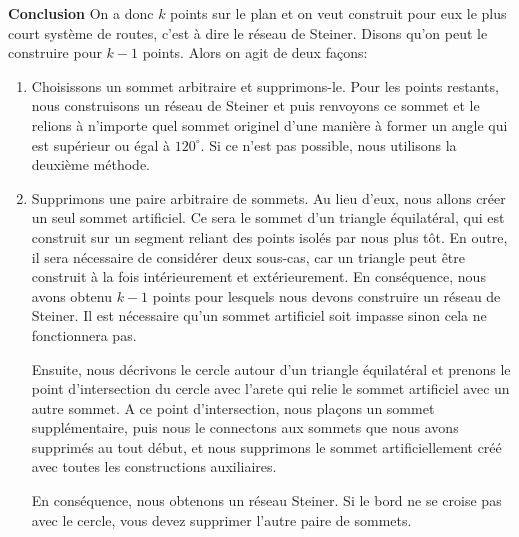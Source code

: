 \documentclass[10pt,a4paper]{article}%
\theoremstyle{theorem}
\theoremstyle{definition}
\begin{document}
        		\textbf{Conclusion}
        		On a donc $k$ points sur le plan et on veut construit pour eux le plus court système de routes, c'est à dire le réseau de Steiner. Disons qu'on peut le construire pour $k-1$ points. Alors on agit de deux façons:
        		\begin{enumerate}
        			\item Choisissons un sommet arbitraire et supprimons-le. Pour les points restants, nous construisons un réseau de Steiner et puis renvoyons ce sommet et le relions à n'importe quel sommet originel d'une manière à former un angle qui est supérieur ou égal à $120^\circ$. Si ce n'est pas possible, nous utilisons la deuxième méthode.
        			\item Supprimons une paire arbitraire de sommets. Au lieu d'eux, nous allons créer un seul sommet artificiel. Ce sera le sommet d'un triangle équilatéral, qui est construit sur un segment reliant des points isolés par nous plus tôt. En outre, il sera nécessaire de considérer deux sous-cas, car un triangle peut être construit à la fois intérieurement et extérieurement. En conséquence, nous avons obtenu $k-1$ points pour lesquels nous devons construire un réseau de Steiner. Il est nécessaire qu'un sommet artificiel soit impasse sinon cela ne fonctionnera pas.
        			
        			Ensuite, nous décrivons le cercle autour d'un triangle équilatéral et prenons le point d'intersection du cercle avec l'arete qui relie le sommet artificiel avec un autre sommet. A ce point d'intersection, nous plaçons un sommet supplémentaire, puis nous le connectons aux sommets que nous avons supprimés au tout début, et nous supprimons le sommet artificiellement créé avec toutes les constructions auxiliaires. 
        			
        			En conséquence, nous obtenons un réseau Steiner. Si le bord ne se croise pas avec le cercle, vous devez supprimer l'autre paire de sommets.
        			

\end{enumerate}
\end{document}
